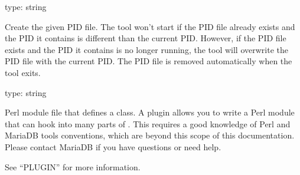 \documentclass[letterpaper,10pt,english]{sphinxmanual}
\begin{document}

\begin{fulllineitems}
\label{\detokenize{mariadb-schema-change:cmdoption-mariadb-schema-change-pid}}
type: string

Create the given PID file.  The tool won’t start if the PID file already
exists and the PID it contains is different than the current PID.  However,
if the PID file exists and the PID it contains is no longer running, the
tool will overwrite the PID file with the current PID.  The PID file is
removed automatically when the tool exits.

\end{fulllineitems}


\begin{fulllineitems}
\label{\detokenize{mariadb-schema-change:cmdoption-mariadb-schema-change-plugin}}
type: string

Perl module file that defines a  class.
A plugin allows you to write a Perl module that can hook into many parts
of .  This requires a good knowledge of Perl and
MariaDB tools conventions, which are beyond this scope of this
documentation.  Please contact MariaDB if you have questions or need help.

See “PLUGIN” for more information.

\end{fulllineitems}
\end{document}
